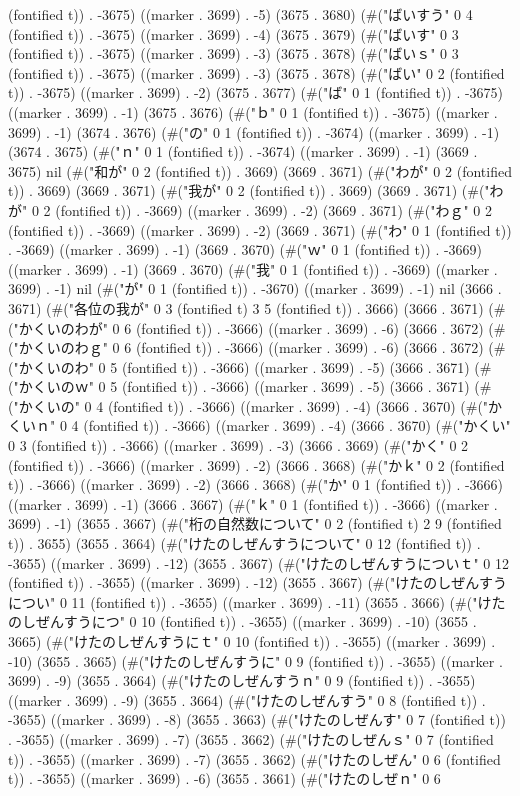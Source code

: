 (fontified t)) . -3675) ((marker . 3699) . -5) (3675 . 3680) (#("ばいすう" 0 4 (fontified t)) . -3675) ((marker . 3699) . -4) (3675 . 3679) (#("ばいす" 0 3 (fontified t)) . -3675) ((marker . 3699) . -3) (3675 . 3678) (#("ばいｓ" 0 3 (fontified t)) . -3675) ((marker . 3699) . -3) (3675 . 3678) (#("ばい" 0 2 (fontified t)) . -3675) ((marker . 3699) . -2) (3675 . 3677) (#("ば" 0 1 (fontified t)) . -3675) ((marker . 3699) . -1) (3675 . 3676) (#("ｂ" 0 1 (fontified t)) . -3675) ((marker . 3699) . -1) (3674 . 3676) (#("の" 0 1 (fontified t)) . -3674) ((marker . 3699) . -1) (3674 . 3675) (#("ｎ" 0 1 (fontified t)) . -3674) ((marker . 3699) . -1) (3669 . 3675) nil (#("和が" 0 2 (fontified t)) . 3669) (3669 . 3671) (#("わが" 0 2 (fontified t)) . 3669) (3669 . 3671) (#("我が" 0 2 (fontified t)) . 3669) (3669 . 3671) (#("わが" 0 2 (fontified t)) . -3669) ((marker . 3699) . -2) (3669 . 3671) (#("わｇ" 0 2 (fontified t)) . -3669) ((marker . 3699) . -2) (3669 . 3671) (#("わ" 0 1 (fontified t)) . -3669) ((marker . 3699) . -1) (3669 . 3670) (#("ｗ" 0 1 (fontified t)) . -3669) ((marker . 3699) . -1) (3669 . 3670) (#("我" 0 1 (fontified t)) . -3669) ((marker . 3699) . -1) nil (#("が" 0 1 (fontified t)) . -3670) ((marker . 3699) . -1) nil (3666 . 3671) (#("各位の我が" 0 3 (fontified t) 3 5 (fontified t)) . 3666) (3666 . 3671) (#("かくいのわが" 0 6 (fontified t)) . -3666) ((marker . 3699) . -6) (3666 . 3672) (#("かくいのわｇ" 0 6 (fontified t)) . -3666) ((marker . 3699) . -6) (3666 . 3672) (#("かくいのわ" 0 5 (fontified t)) . -3666) ((marker . 3699) . -5) (3666 . 3671) (#("かくいのｗ" 0 5 (fontified t)) . -3666) ((marker . 3699) . -5) (3666 . 3671) (#("かくいの" 0 4 (fontified t)) . -3666) ((marker . 3699) . -4) (3666 . 3670) (#("かくいｎ" 0 4 (fontified t)) . -3666) ((marker . 3699) . -4) (3666 . 3670) (#("かくい" 0 3 (fontified t)) . -3666) ((marker . 3699) . -3) (3666 . 3669) (#("かく" 0 2 (fontified t)) . -3666) ((marker . 3699) . -2) (3666 . 3668) (#("かｋ" 0 2 (fontified t)) . -3666) ((marker . 3699) . -2) (3666 . 3668) (#("か" 0 1 (fontified t)) . -3666) ((marker . 3699) . -1) (3666 . 3667) (#("ｋ" 0 1 (fontified t)) . -3666) ((marker . 3699) . -1) (3655 . 3667) (#("桁の自然数について" 0 2 (fontified t) 2 9 (fontified t)) . 3655) (3655 . 3664) (#("けたのしぜんすうについて" 0 12 (fontified t)) . -3655) ((marker . 3699) . -12) (3655 . 3667) (#("けたのしぜんすうについｔ" 0 12 (fontified t)) . -3655) ((marker . 3699) . -12) (3655 . 3667) (#("けたのしぜんすうについ" 0 11 (fontified t)) . -3655) ((marker . 3699) . -11) (3655 . 3666) (#("けたのしぜんすうにつ" 0 10 (fontified t)) . -3655) ((marker . 3699) . -10) (3655 . 3665) (#("けたのしぜんすうにｔ" 0 10 (fontified t)) . -3655) ((marker . 3699) . -10) (3655 . 3665) (#("けたのしぜんすうに" 0 9 (fontified t)) . -3655) ((marker . 3699) . -9) (3655 . 3664) (#("けたのしぜんすうｎ" 0 9 (fontified t)) . -3655) ((marker . 3699) . -9) (3655 . 3664) (#("けたのしぜんすう" 0 8 (fontified t)) . -3655) ((marker . 3699) . -8) (3655 . 3663) (#("けたのしぜんす" 0 7 (fontified t)) . -3655) ((marker . 3699) . -7) (3655 . 3662) (#("けたのしぜんｓ" 0 7 (fontified t)) . -3655) ((marker . 3699) . -7) (3655 . 3662) (#("けたのしぜん" 0 6 (fontified t)) . -3655) ((marker . 3699) . -6) (3655 . 3661) (#("けたのしぜｎ" 0 6 